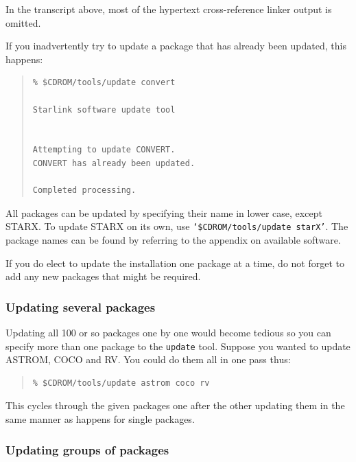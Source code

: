 \documentclass[twoside,11pt]{article}
\newcommand{\htmlref}[2]{#1}
\newcommand{\xlabel}[1]{}
\renewcommand{\_}{\texttt{\symbol{95}}}
\begin{document}
In the transcript above, most of the hypertext cross-reference linker
output is omitted.

If you inadvertently try to update a package that has already been
updated, this happens:

\begin{quote}
\begin{small}
\begin{verbatim}
% $CDROM/tools/update convert
 
Starlink software update tool
 
 
Attempting to update CONVERT.
CONVERT has already been updated.
 
Completed processing.
\end{verbatim}
\end{small}
\end{quote}

All packages can be updated by specifying their name in lower case,
except STARX\@.  To update STARX on its own, use
\texttt{`\$CDROM/tools/update starX'}.  The package names can be found by 
referring to the appendix on \htmlref{available software}{available_software}.

If you do elect to update the installation one package at a time, do
not forget to add any new packages that might be required.

\subsubsection{\xlabel{updating_several_packages}Updating several packages}
\label{updating_several_packages}

Updating all 100 or so packages one by one would become tedious so you can 
specify more than one package to the \texttt{update} tool.  Suppose you
wanted to update ASTROM, COCO and RV\@.  You could do them all in one pass thus:

\begin{quote}
\begin{verbatim}
% $CDROM/tools/update astrom coco rv
\end{verbatim}
\end{quote}

This cycles through the given packages one after the other updating
them in the same manner as happens for single packages.

\subsubsection{\xlabel{updating_groups_of_packages}Updating groups of packages}
\label{updating_groups_of_packages}
\end{document}
